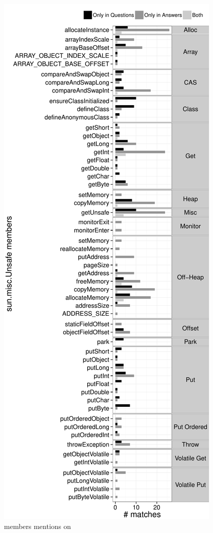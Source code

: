 \begin{figure}[h!]
\includegraphics[width=\columnwidth]{chapters/unsafe/usage-so}
\caption{\smu{} members mentions on \stackoverflow{}}
\label{fig:overview-so}
\end{figure}

